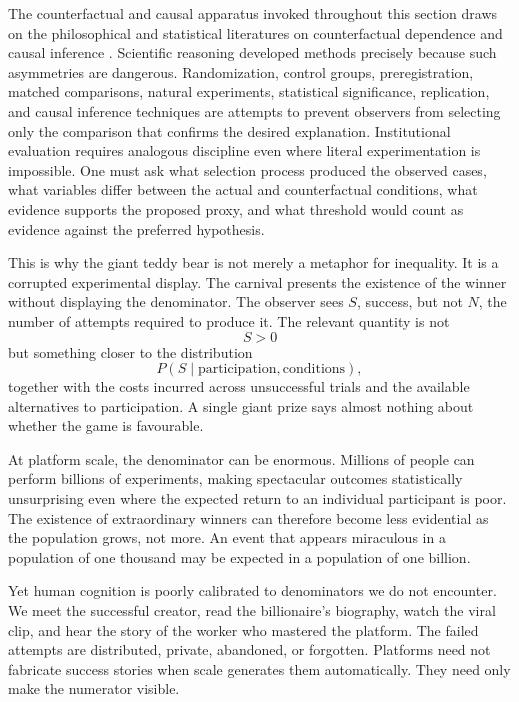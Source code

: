 \documentclass[11pt]{article}
\begin{document}
The counterfactual and causal apparatus invoked throughout this section draws on the philosophical and statistical literatures on counterfactual dependence and causal inference \citep{lewis1973counterfactuals,pearl2009causality}. Scientific reasoning developed methods precisely because such asymmetries are dangerous. Randomization, control groups, preregistration, matched comparisons, natural experiments, statistical significance, replication, and causal inference techniques are attempts to prevent observers from selecting only the comparison that confirms the desired explanation. Institutional evaluation requires analogous discipline even where literal experimentation is impossible. One must ask what selection process produced the observed cases, what variables differ between the actual and counterfactual conditions, what evidence supports the proposed proxy, and what threshold would count as evidence against the preferred hypothesis.

This is why the giant teddy bear is not merely a metaphor for inequality. It is a corrupted experimental display. The carnival presents the existence of the winner without displaying the denominator. The observer sees \(S\), success, but not \(N\), the number of attempts required to produce it. The relevant quantity is not
\[
S>0
\]
but something closer to the distribution
\[
P(S\mid \text{participation},\text{conditions}),
\]
together with the costs incurred across unsuccessful trials and the available alternatives to participation. A single giant prize says almost nothing about whether the game is favourable.

At platform scale, the denominator can be enormous. Millions of people can perform billions of experiments, making spectacular outcomes statistically unsurprising even where the expected return to an individual participant is poor. The existence of extraordinary winners can therefore become less evidential as the population grows, not more. An event that appears miraculous in a population of one thousand may be expected in a population of one billion.

Yet human cognition is poorly calibrated to denominators we do not encounter. We meet the successful creator, read the billionaire's biography, watch the viral clip, and hear the story of the worker who mastered the platform. The failed attempts are distributed, private, abandoned, or forgotten. Platforms need not fabricate success stories when scale generates them automatically. They need only make the numerator visible.
\end{document}
